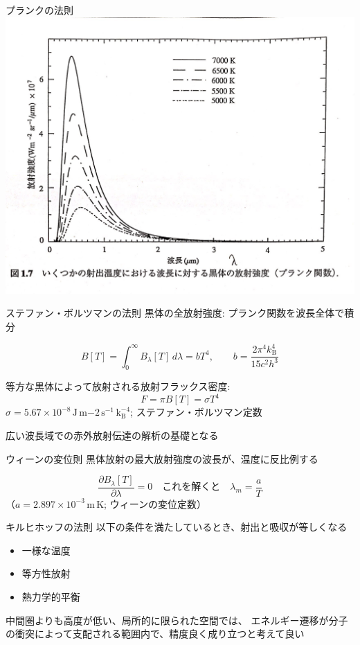 \documentclass[unicode,colorlinks]{beamer}
\newcommand{\Unit}[1]{\,\mathrm{#1}}
\begin{document}
\begin{frame}{プランクの法則}
	\includegraphics[width=\textwidth]{planck.jpg}
\end{frame}

\begin{frame}{ステファン・ボルツマンの法則}
	黒体の全放射強度: プランク関数を波長全体で積分

	\[B[T]=\int^\infty_0 B_\lambda[T]\,d\lambda=bT^4, \qquad b=\frac{2\pi^4k_\mathrm{B}^4}{15c^2h^3}\]

	等方な黒体によって放射される放射フラックス密度: \[F=\pi B[T]=\sigma T^4\]
	$\sigma=5.67\times10^{-8}\Unit{J\,m{-2}\,s^{-1}\,k_\mathrm{B}^{-4}}$; ステファン・ボルツマン定数

	広い波長域での赤外放射伝達の解析の基礎となる
\end{frame}

\begin{frame}{ウィーンの変位則}
	黒体放射の最大放射強度の波長が、温度に反比例する

	\[\frac{\partial B_\lambda[T]}{\partial\lambda}=0\quad\text{これを解くと}\quad\lambda_m=\frac{a}{T}\]
	（$a=2.897\times10^{-3}\Unit{m\,K}$; ウィーンの変位定数）
\end{frame}

\begin{frame}{キルヒホッフの法則}
	以下の条件を満たしているとき、射出と吸収が等しくなる

	\begin{itemize}
		\item 一様な温度
		\item 等方性放射
		\item 熱力学的平衡
	\end{itemize}

	中間圏よりも高度が低い、局所的に限られた空間では、
	エネルギー遷移が分子の衝突によって支配される範囲内で、精度良く成り立つと考えて良い
\end{frame}
\end{document}
